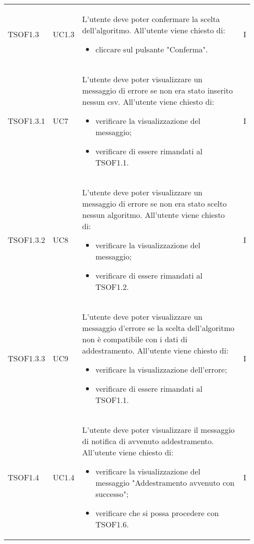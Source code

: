 \begin{longtable}{C{2.5cm} C{2.5cm} L{8cm} C{2cm}}
TSOF1.3 & UC1.3 & 
L'utente deve poter confermare la scelta dell'algoritmo. \newline All'utente viene chiesto di:
\begin{itemize}
	\item cliccare sul pulsante "Conferma".
\end{itemize} & I \\

TSOF1.3.1 & UC7 & 
L'utente deve poter visualizzare un messaggio di errore se non era stato inserito nessun csv. \newline All'utente viene chiesto di:
\begin{itemize}
	\item verificare la visualizzazione del messaggio;
	\item verificare di essere rimandati al TSOF1.1.
\end{itemize} & I \\

TSOF1.3.2 & UC8 & 
L'utente deve poter visualizzare un messaggio di errore se non era stato scelto nessun algoritmo. \newline All'utente viene chiesto di:
\begin{itemize}
	\item verificare la visualizzazione del messaggio;
	\item verificare di essere rimandati al TSOF1.2.
\end{itemize} & I \\

TSOF1.3.3 & UC9 & 
L'utente deve poter visualizzare un messaggio d'errore se la scelta dell'algoritmo non è compatibile con i dati di addestramento. \newline All'utente viene chiesto di:
\begin{itemize}
	\item verificare la visualizzazione dell'errore;
	\item verificare di essere rimandati al TSOF1.1.
\end{itemize} & I \\

TSOF1.4 & UC1.4 & 
L'utente deve poter visualizzare il messaggio di notifica di avvenuto addestramento. \newline All'utente viene chiesto di:
\begin{itemize}
	\item verificare la visualizzazione del messaggio "Addestramento avvenuto con successo";
	\item verificare che si possa procedere con TSOF1.6.
\end{itemize} & I \\


\end{longtable}
